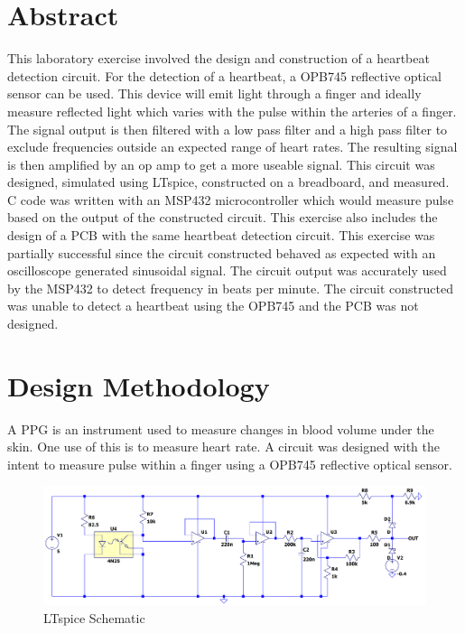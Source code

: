 \documentclass[CMPE]{KGCOEReport}
\begin{document}
\maketitle

\section*{Abstract}

This laboratory exercise involved the design and construction of a heartbeat detection circuit. For the detection of a heartbeat, a OPB745 reflective optical sensor can be used. This device will emit light through a finger and ideally measure reflected light which varies with the pulse within the arteries of a finger. The signal output is then filtered with a low pass filter and a high pass filter to exclude frequencies outside an expected range of heart rates. The resulting signal is then amplified by an op amp to get a more useable signal. This circuit was designed, simulated using LTspice, constructed on a breadboard, and measured. C code was written with an MSP432 microcontroller which would measure pulse based on the output of the constructed circuit. This exercise also includes the design of a PCB with the same heartbeat detection circuit. This exercise was partially successful since the circuit constructed behaved as expected with an oscilloscope generated sinusoidal signal. The circuit output was accurately used by the MSP432 to detect frequency in beats per minute. The circuit constructed was unable to detect a heartbeat using the OPB745 and the PCB was not designed.

\section*{Design Methodology}

A PPG is an instrument used to measure changes in blood volume under the skin. One use of this is to measure heart rate. A circuit was designed with the intent to measure pulse within a finger using a OPB745 reflective optical sensor. 

\begin{figure}[H]
    \centering
    \includegraphics[width=1\textwidth]{LTspiceCompleteSchematic.png}
    \caption{LTspice Schematic}
    \label{fig:ltspiceCompleteSchematic}
\end{figure}
\end{document}
